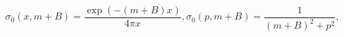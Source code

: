\begin{equation}
\sigma_{0}(x,m+B)=\frac{\exp(-(m+B)x)}{4\pi x},\sigma_{0}(p,m+B)=\frac
{1}{(m+B)^{2}+p^{2}},
\end{equation}

